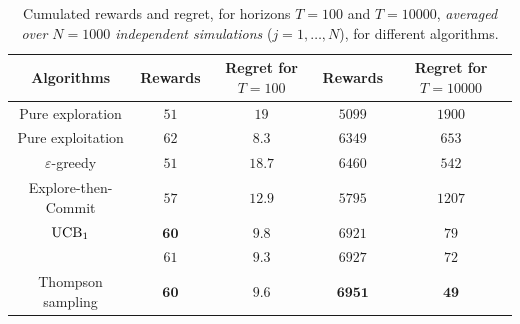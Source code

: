\begin{table}[ht]
        \centering
        \begin{tabular}{c|cc|cc}
        \textbf{Algorithms}
        & Rewards
        & Regret for $T=100$
        & Rewards
        & Regret for $T=10000$ \\
            \hline
            Pure exploration
                & $51$ & $19$
                & $5099$ & $1900$ \\
            Pure exploitation
                & $62$ & $8.3$
                & $6349$ & $653$ \\
            \hline
            $\varepsilon$-greedy
                & $51$ & $18.7$
                & $6460$ & $542$ \\
            Explore-then-Commit
                & $57$ & $12.9$
                & $5795$ & $1207$ \\
            \hline
            $\mathrm{UCB}_1$
                & $\mathbf{60}$ & $\mathbf{9.8}$
                & $6921$ & $79$ \\
            \klUCB{}
                & $61$ & $9.3$
                & $6927$ & $72$ \\
            \hline
            Thompson sampling
                & $\mathbf{60}$ & $\mathbf{9.6}$
                & $\mathbf{6951}$ & $\mathbf{49}$ \\
        \end{tabular}
        \caption{Cumulated rewards and regret, for horizons $T=100$ and $T=10000$, \emph{averaged over $N=1000$ independent simulations} ($j=1,\dots,N$), for different algorithms.}
        \label{table:2:meanResults}
\end{table}

%



